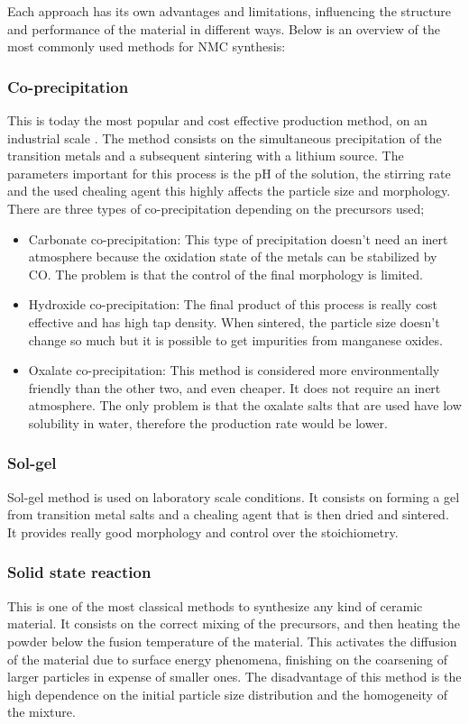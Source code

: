 \documentclass{article}
\begin{document}
Each approach has its own advantages and limitations, influencing the structure and performance of the material in different ways. Below is an overview of the most commonly used methods for NMC synthesis:
\subsubsection{Co-precipitation}
This is today the most popular and cost effective production method, on an industrial scale
. The method consists on the simultaneous precipitation of the transition metals and a subsequent sintering with
a lithium source. The parameters important for this process is the pH of the solution, the stirring rate 
and the used chealing agent this highly affects the particle size and morphology. \cite{process}  \\
There are three types of co-precipitation depending on the precursors used;
\begin{itemize}
  \item Carbonate co-precipitation: This type of precipitation doesn't need an inert atmosphere
  because the oxidation state of the metals can be stabilized by CO. The problem is that
the control of the final morphology is limited. \cite{process}
  \item Hydroxide co-precipitation: The final product of this process is really
  cost effective and has high tap density. When sintered, the particle size doesn't change
  so much but it is possible to get impurities from manganese oxides.\cite{process}
  \item Oxalate co-precipitation: This method is considered more environmentally
  friendly than the other two, and even cheaper. It does not require an inert 
  atmosphere. The only problem is that the oxalate salts that are used 
  have low solubility in water, therefore the production rate would be lower\cite{process}.
\end{itemize}

\subsubsection{Sol-gel}
Sol-gel method is used on laboratory scale conditions. It consists on forming a gel from transition 
metal salts and a chealing agent that is then dried and sintered. It provides really good morphology and control over the stoichiometry\cite{process}.

\subsubsection{Solid state reaction}
This is one of the most classical methods to synthesize any kind of ceramic material. 
It consists on the correct mixing of the precursors, and then heating the powder below the fusion temperature of the material.
This activates the diffusion of the material due to surface energy phenomena, finishing on the coarsening of larger particles
in expense of smaller ones. The disadvantage of this method is the high dependence on the initial particle size distribution and 
the homogeneity of the mixture\cite{process}.
\end{document}
